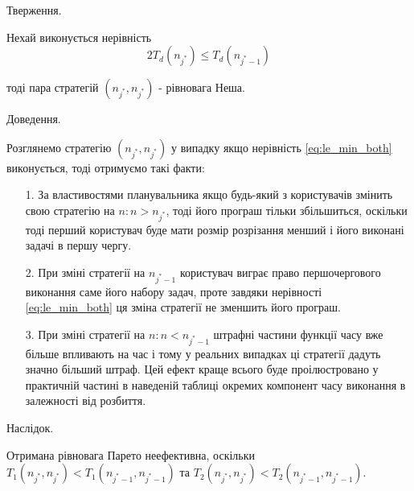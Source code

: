 Тверження.

Нехай виконується нерівність
\begin{equation}
	2T_d(n_{j^*}) \le T_d(n_{{j^*}-1})
	\label{eq:le_min_both}
\end{equation}

тоді пара стратегій $(n_{j^*},n_{j^*})$ - рівновага Неша.

Доведення.

Розглянемо стратегію $(n_{j^*},n_{j^*})$ у випадку якщо нерівність \ref{eq:le_min_both} виконується, тоді отримуємо такі факти:
\begin{itemize}
	\item[1.] За властивостями планувальника якщо будь-який з користувачів змінить свою стратегію на $n: n > n_{j^*}$, тоді його програш тільки збільшиться, оскільки тоді перший користувач буде мати розмір розрізання менший і його виконані задачі в першу чергу.
	
	\item[2.] При зміні стратегії на $n_{j^*-1}$ користувач виграє право першочергового виконання саме його набору задач, проте завдяки нерівності \ref{eq:le_min_both} ця зміна стратегії не зменшить його програш.
	
	\item[3.] При зміні стратегії на $n: n < n_{j^* - 1}$ штрафні частини функції часу вже більше впливають на час і тому у реальних випадках ці стратегії дадуть значно більший штраф. Цей ефект краще всього буде проілюстровано у практичній частині в наведеній таблиці окремих компонент часу виконання в залежності від розбиття.
\end{itemize}

Наслідок.

Отримана рівновага Парето неефективна, оскільки $T_1(n_{j^*},n_{j^*}) < T_1(n_{j^*-1},n_{j^*-1})$ та $T_2(n_{j^*},n_{j^*}) < T_2(n_{j^*-1},n_{j^*-1})$.




 